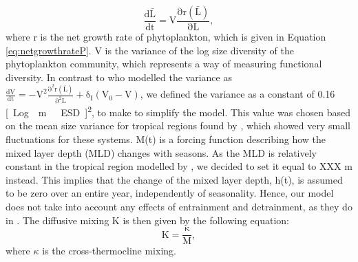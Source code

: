 \begin{equation}
    \label{eq:changecellsize}
    \mathrm{\frac{d\bar{L}}{dt} = V\frac{\partial r(\bar{L})}{\partial L}},
\end{equation}
where r is the net growth rate of phytoplankton, which is given in Equation \eqref{eq:netgrowthrateP}. V is the variance of the log size diversity of the phytoplankton community, which represents a way of measuring functional diversity. In contrast to \cite{AcevedoTrejos2015} who modelled the variance as $\mathrm{\frac{dV}{dt}=-V^2\frac{\partial^2 r(\bar{L}) }{\partial^2 L}+\delta_I(V_0-V)}$, we defined the variance as a constant of 0.16 \si{[Log\mu m \ ESD]^2}, to make to simplify the model. This value was chosen based on the mean size variance for tropical regions found by \cite{AcevedoTrejos2015}, which showed very small fluctuations for these systems.
\newline
\newline
M(t) is a forcing function describing how the mixed layer depth (MLD) changes with seasons. As the MLD is relatively constant in the tropical region modelled by \cite{AcevedoTrejos2015}, we decided to set it equal to XXX m instead. This implies that the change of the mixed layer depth, h(t), is assumed to be zero over an entire year, independently of seasonality. Hence, our model does not take into account any effects of entrainment and detrainment, as they do in \cite{AcevedoTrejos2015}.
\newline
\newline
The diffusive mixing K is then given by the following equation:
\begin{equation}
    \label{eq:K}
    \mathrm{K = \frac{\kappa}{M}},
\end{equation}
where $\kappa$ is the cross-thermocline mixing. 


